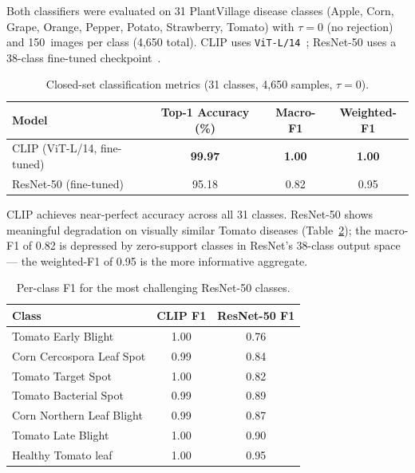 Both classifiers were evaluated on 31 PlantVillage disease classes
(Apple, Corn, Grape, Orange, Pepper, Potato, Strawberry, Tomato)
with $\tau = 0$ (no rejection) and 150~images per class (4,650 total).
CLIP uses \texttt{ViT-L/14}~\cite{keetawan2024plantdisease};
ResNet-50 uses a 38-class fine-tuned checkpoint~\cite{SanketJadhavplantdisease}.


\begin{table}[h]
    \centering
    \caption{Closed-set classification metrics (31 classes, 4,650 samples, $\tau=0$).}
    \label{tab:closed_set}
    \begin{tabular}{lccc}
        \hline
        \textbf{Model} & \textbf{Top-1 Accuracy (\%)} & \textbf{Macro-F1} & \textbf{Weighted-F1} \\
        \hline
        CLIP (ViT-L/14, fine-tuned) & \textbf{99.97} & \textbf{1.00} & \textbf{1.00} \\
        ResNet-50 (fine-tuned)      & 95.18          & 0.82          & 0.95          \\
        \hline
    \end{tabular}
\end{table}

CLIP achieves near-perfect accuracy across all 31 classes.
ResNet-50 shows meaningful degradation on visually similar Tomato diseases
(Table~\ref{tab:closed_set_perclass}); the macro-F1 of 0.82 is depressed by
zero-support classes in ResNet's 38-class output space --- the weighted-F1
of 0.95 is the more informative aggregate.

\begin{table}[h]
    \centering
    \caption{Per-class F1 for the most challenging ResNet-50 classes.}
    \label{tab:closed_set_perclass}
    \begin{tabular}{lcc}
        \hline
        \textbf{Class} & \textbf{CLIP F1} & \textbf{ResNet-50 F1} \\
        \hline
        Tomato Early Blight                        & 1.00 & 0.76 \\
        Corn Cercospora Leaf Spot                  & 0.99 & 0.84 \\
        Tomato Target Spot                         & 1.00 & 0.82 \\
        Tomato Bacterial Spot                      & 0.99 & 0.89 \\
        Corn Northern Leaf Blight                  & 0.99 & 0.87 \\
        Tomato Late Blight                         & 1.00 & 0.90 \\
        Healthy Tomato leaf                        & 1.00 & 0.95 \\
        \hline
    \end{tabular}
\end{table}

